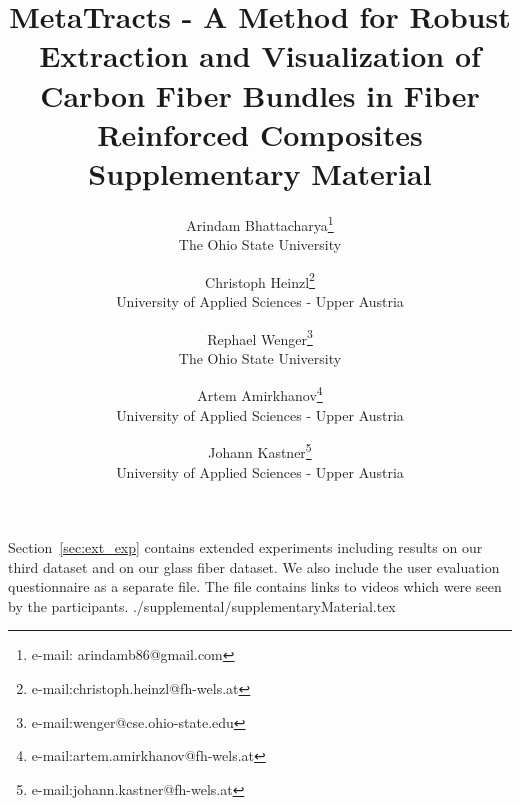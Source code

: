 \documentclass[10pt,a4paper]{article}
\begin{document}
	\title{MetaTracts - A Method for Robust Extraction and Visualization of Carbon Fiber Bundles in Fiber Reinforced Composites \\
		Supplementary Material}
	\author{Arindam Bhattacharya\thanks{e-mail: arindamb86@gmail.com}\\ %
		\scriptsize The Ohio State University %
		\and Christoph Heinzl\thanks{e-mail:christoph.heinzl@fh-wels.at}\\ %
		\scriptsize University of Applied Sciences - Upper Austria%
		\and Rephael Wenger\thanks{e-mail:wenger@cse.ohio-state.edu}\\ %
		\scriptsize The Ohio State University
		\and Artem Amirkhanov\thanks{e-mail:artem.amirkhanov@fh-wels.at}\\ %
		\scriptsize University of Applied Sciences - Upper Austria%
		\and Johann Kastner\thanks{e-mail:johann.kastner@fh-wels.at}\\ %
		\scriptsize University of Applied Sciences - Upper Austria%
		}
	\maketitle
Section~\ref{sec:ext_exp} contains extended experiments including results on our third dataset and  on our glass fiber dataset.
We also include the user evaluation  questionnaire as a separate file. The file contains links to videos which were seen by the participants. 
 {./supplemental/supplementaryMaterial.tex}
\end{document}
